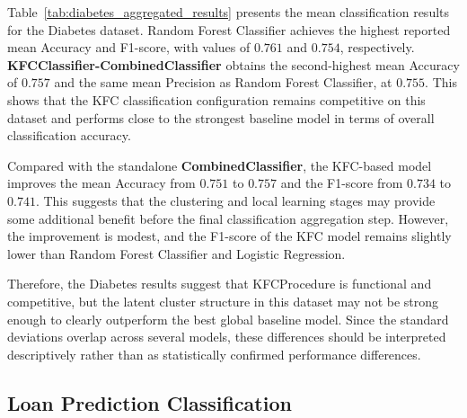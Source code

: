 \hs Table~\ref{tab:diabetes_aggregated_results} presents the mean classification results for the Diabetes dataset. Random Forest Classifier achieves the highest reported mean Accuracy and F1-score, with values of $0.761$ and $0.754$, respectively. \textbf{KFCClassifier-CombinedClassifier} obtains the second-highest mean Accuracy of $0.757$ and the same mean Precision as Random Forest Classifier, at $0.755$. This shows that the KFC classification configuration remains competitive on this dataset and performs close to the strongest baseline model in terms of overall classification accuracy.

Compared with the standalone \textbf{CombinedClassifier}, the KFC-based model improves the mean Accuracy from $0.751$ to $0.757$ and the F1-score from $0.734$ to $0.741$. This suggests that the clustering and local learning stages may provide some additional benefit before the final classification aggregation step. However, the improvement is modest, and the F1-score of the KFC model remains slightly lower than Random Forest Classifier and Logistic Regression.

Therefore, the Diabetes results suggest that KFCProcedure is functional and competitive, but the latent cluster structure in this dataset may not be strong enough to clearly outperform the best global baseline model. Since the standard deviations overlap across several models, these differences should be interpreted descriptively rather than as statistically confirmed performance differences.

\subsection{Loan Prediction Classification}

